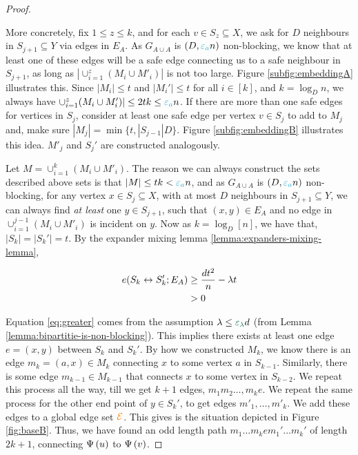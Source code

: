 \documentclass[11pt]{article}
\newcommand{\epsilonA}{\textcolor{ballblue}{\epsilon_a}}
\newcommand{\epsilonL}{\textcolor{cadmiumgreen}{\epsilon_\lambda}}
\newcommand{\BipartiteG}{G_{A \cup A}}
\begin{document}
\begin{proof}
\begin{tcolorbox}
More concretely, fix $1 \leq z \leq k$, and for each $v \in S_z \subseteq X$, we ask for $D$ neighbours in $S_{j+1} \subseteq Y$ via edges in $E_A$.
As $\BipartiteG$ is $(D, \epsilonA n)$ non-blocking, we know that at least one of these edges will be a safe edge connecting us to a safe neighbour in $S_{j+1}$, as long as $|\cup_{i=1}^{z} (M_i \cup M'_i)|$ is not too large.
Figure \ref{subfig:embeddingA} illustrates this.
Since $|M_i| \leq t$ and $|M_i'| \leq t$ for all $i \in [k]$, and $k = \log_D n$, we always have $\cup_{i=1}^{z} (M_i \cup M'_i)| \leq 2tk \leq \epsilonA n$.
If there are more than one safe edges for  vertices in $S_j$, consider at least one safe edge per vertex $v \in S_j$ to add to $M_j$ and, make sure $|M_j| = \min\{t, |S_{j-1}|D\}$.
Figure \ref{subfig:embeddingB} illustrates this idea.
$M'_j$ and $S_j'$ are constructed analogously.\\



\end{tcolorbox}

Let $M = \cup_{i=1}^k (M_i \cup M'_i)$.
The reason we can always construct the sets described above sets is that $|M| \leq tk < \epsilonA n$, and as $\BipartiteG$ is $(D, \epsilonA n)$ non-blocking, for any vertex $x \in S_j \subseteq X$, with at most $D$ neighbours in $S_{j+1} \subseteq Y$, we can always find \emph{at least} one $y \in S_{j+1}$, such that $(x,y) \in E_A$ and no edge in $\cup_{i=1}^{j-1} (M_i \cup M'_i)$ is incident on $y$.
Now as $k = \log_D[n]$, we have that, $|S_k| = |S_k'|= t$.
By the expander mixing lemma \ref{lemma:expanders-mixing-lemma},

\begin{align}
e(S_k \leftrightarrow S_k'; E_A)
 &\geq \frac{d t^2}{n} - \lambda t \\
	&> 0 \label{eq:greater}
\end{align}

Equation \eqref{eq:greater} comes from the assumption $\lambda \leq \epsilonL d$ (from Lemma \ref{lemma:bipartitie-is-non-blocking}).
This implies there exists at least one edge $e=(x,y)$ between $S_k$ and $S_k'$.
By how we constructed $M_k$, we know there is an edge $m_k = (a,x) \in M_k$ connecting $x$ to some vertex $a$ in $S_{k-1}$. 
Similarly, there is some edge $m_{k-1} \in M_{k-1}$ that connects $x$ to some vertex in $S_{k-2}$.
We repeat this process all the way, till we get $k+1$ edges, $m_1 m_2 \dots, m_k e$.
We repeat the same process for the other end point of $y \in S_k'$, to get edges $m'_1, \dots, m'_k$.
We add these edges to a global edge set $\textcolor{orange}{\mathcal{E}}$.
This gives is the situation depicted in Figure \ref{fig:baseB}.
Thus, we have found an odd length path $m_1\dots m_k e m_1'\dots m_k'$ of length $2k+1$, connecting $\Psi\left(u\right)$ to $\Psi\left(v\right)$.


\end{proof}
\end{document}
